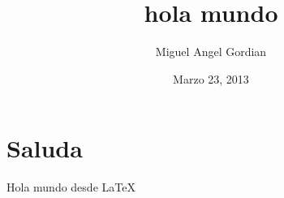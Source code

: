 \documentclass[a4paper, 13pt]{article}
\begin{document}
  
\title{hola mundo}
\author{Miguel Angel Gordian}
\date{Marzo 23, 2013}
 
\maketitle

\newpage

\section{Saluda}
Hola mundo desde \LaTeX
\end{document}
